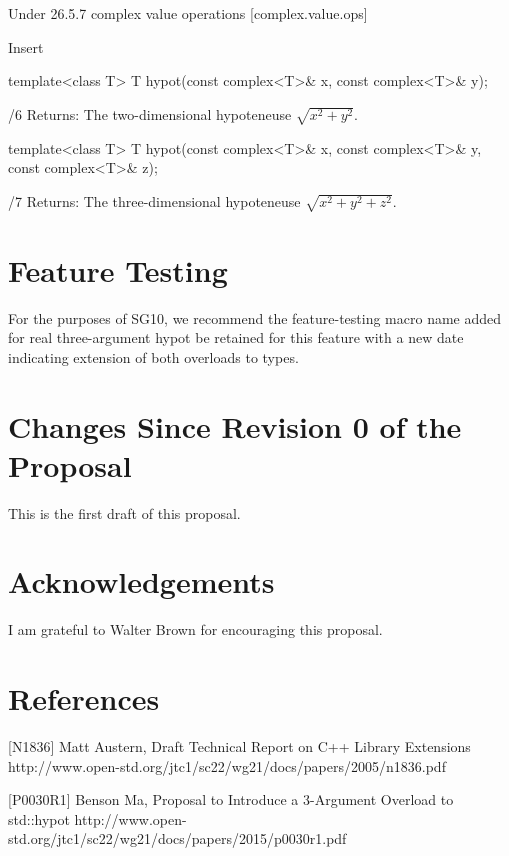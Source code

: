 \documentclass[ebook,10pt,oneside,openany,final]{memoir}
\begin{document}
Under
26.5.7	complex value operations	[complex.value.ops]

Insert

\begin{codeblock}
    template<class T> T hypot(const complex<T>\& x, const complex<T>\& y);
\end{codeblock}
/6	Returns: The two-dimensional hypoteneuse $\sqrt{x^2 + y^2}$.

\begin{codeblock}
    template<class T> T hypot(const complex<T>\& x, const complex<T>\& y, const complex<T>\& z);
\end{codeblock}
/7	Returns: The three-dimensional hypoteneuse $\sqrt{x^2 + y^2 + z^2}$.


\section{Feature Testing}

For the purposes of SG10, we recommend the feature-testing macro name 
added for real three-argument hypot be retained for this feature with a new date indicating
extension of both  overloads to  types.


\section{Changes Since Revision 0 of the Proposal}

This is the first draft of this proposal.


\section{Acknowledgements}

I am grateful to Walter Brown for encouraging this proposal.


\section{References}

[N1836] Matt Austern, Draft Technical Report on C++ Library Extensions
http://www.open-std.org/jtc1/sc22/wg21/docs/papers/2005/n1836.pdf

[P0030R1] Benson Ma, Proposal to Introduce a 3-Argument Overload to std::hypot
http://www.open-std.org/jtc1/sc22/wg21/docs/papers/2015/p0030r1.pdf
\end{document}
